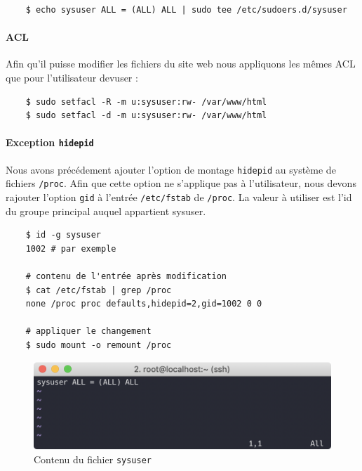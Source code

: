 \documentclass{extarticle} %
\begin{document}
    \begin{verbatim}
    $ echo sysuser ALL = (ALL) ALL | sudo tee /etc/sudoers.d/sysuser
    \end{verbatim}


    \paragraph{ACL} Afin qu'il puisse modifier les fichiers du site web nous appliquons les mêmes ACL que pour l'utilisateur devuser :

    \begin{verbatim}
    $ sudo setfacl -R -m u:sysuser:rw- /var/www/html
    $ sudo setfacl -d -m u:sysuser:rw- /var/www/html
    \end{verbatim}

    \paragraph{Exception \texttt{hidepid}} Nous avons précédement ajouter l'option de montage \texttt{hidepid}
    au système de fichiers \texttt{/proc}. Afin que cette option ne s'applique pas à l'utilisateur, nous devons
     rajouter l'option \texttt{gid} à l'entrée \texttt{/etc/fstab} de \texttt{/proc}. La valeur à utiliser est
      l'id du groupe principal auquel appartient sysuser.

    \begin{verbatim}
    $ id -g sysuser
    1002 # par exemple

    # contenu de l'entrée après modification
    $ cat /etc/fstab | grep /proc
    none /proc proc defaults,hidepid=2,gid=1002 0 0

    # appliquer le changement
    $ sudo mount -o remount /proc
    \end{verbatim}

    \begin{figure}[H]
      \centering
      \includegraphics[scale=0.7]{img/sysuser.png}
      \caption{Contenu du fichier \texttt{sysuser}}
    \end{figure}
\end{document}

